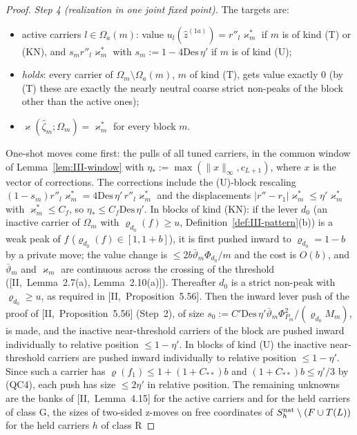 \documentclass[10pt]{amsart}
\theoremstyle{definition}
\theoremstyle{remark}
\newcommand{\zh}{\hat z}
\begin{document}
\begin{proof}
\emph{Step 4 (realization in one joint fixed point).}  The targets are:
\begin{itemize}
\item active carriers $l\in\Omega_a(m)$: value $u_l(\zh^{(1a)})=r''_l\varkappa^*_m$
if $m$ is of kind (T) or (KN), and $s_mr''_l\varkappa^*_m$ with $s_m:=1-4\mathrm{Des}
\,\eta'$ if $m$ is of kind (U);
\item \emph{holds}: every carrier of $\Omega_m\setminus\Omega_a(m)$, $m$ of kind (T),
gets value exactly $0$ (by (T) these are exactly the nearly neutral coarse
strict non-peaks of the block other than the active ones);
\item $\varkappa(\hat\zeta_m;\Omega_m)=\varkappa^*_m$ for every block $m$.
\end{itemize}
One-shot moves come first: the pulls of all tuned carriers, in the common
window of Lemma~\ref{lem:III-window} with $\eta_*:=\max(\|x\|_\infty,c_{L+1})$,
where $x$ is the vector of corrections.  The corrections include the
(U)-block rescaling $(1-s_m)r''_l\varkappa^*_m=4\mathrm{Des}\,\eta'\,r''_l
\varkappa^*_m$ and the displacements $|r''-r_1|\varkappa^*_m\le\eta'\varkappa^*_m$
with $\varkappa^*_m\le C_f$, so $\eta_*\le C_f\mathrm{Des}\,\eta'$.  In
blocks of kind (KN): if the lever $d_0$ (an inactive carrier of $\Omega_m$
with $\varrho_{d_0}(f)\ge u$, Definition~\ref{def:III-pattern}(b)) is a weak
peak of $f$ ($\varrho_{d_0}(f)\in[1,1+b]$), it is first pushed inward to
$\varrho_{d_0}=1-b$ by a private move; the value change is $\le2b\bar
\vartheta_m\Phi_{d_0}/m$ and the cost is $O(b)$, and $\bar\vartheta_m$ and
$\varkappa_m$ are continuous across the crossing of the threshold
([II,~Lemma~2.7(a), Lemma~2.10(a)]).  Thereafter $d_0$ is a strict non-peak
with $\varrho_{d_0}\ge u$, as required in [II,~Proposition~5.56].  Then the
inward lever push of the proof of [II,~Proposition~5.56] (Step~2), of size
$s_0:=C'\mathrm{Des}\,\eta'\bar\vartheta_m\Phi_{P_m}^2/(\varrho_{d_0}M_m)$, is
made, and the inactive near-threshold carriers of the block are pushed
inward individually to relative position $\le1-\eta'$.  In blocks of kind
(U) the inactive near-threshold carriers are pushed inward individually to
relative position $\le1-\eta'$.  Since such a carrier has $\varrho(f_1)\le1+(1+C_{**})b$ and
$(1+C_{**})b\le\eta'/3$ by (QC4), each push has size $\le2\eta'$ in relative
position.  The remaining unknowns are the banks
of [II,~Lemma~4.15] for the active carriers and for the held carriers of
class G, the sizes of two-sided z-moves on free coordinates of
$S^{\rm nat}_h\setminus(F\cup T(L))$ for the held carriers $h$ of class R

\end{proof}
\end{document}
